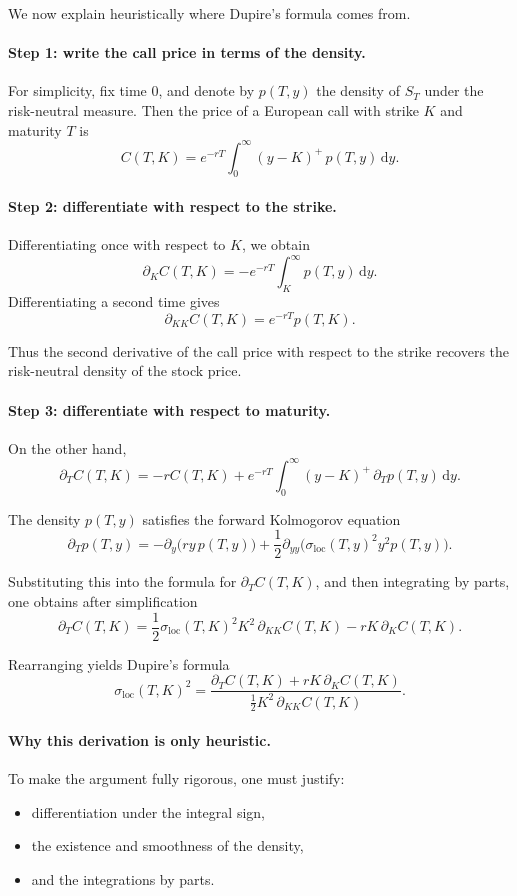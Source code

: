 \documentclass[11pt]{article}
\theoremstyle{plain}
\theoremstyle{definition}
\theoremstyle{remark}
\begin{document}
We now explain heuristically where Dupire's formula comes from.

\paragraph{Step 1: write the call price in terms of the density.}
For simplicity, fix time \(0\), and denote by \(p(T,y)\) the density of
\(S_T\) under the risk-neutral measure.
Then the price of a European call with strike \(K\) and maturity \(T\)
is
\[
C(T,K)
=
e^{-rT}\int_0^\infty (y-K)^+\,p(T,y)\,\mathrm{d}y.
\]

\paragraph{Step 2: differentiate with respect to the strike.}
Differentiating once with respect to \(K\), we obtain
\[
\partial_K C(T,K)
=
-e^{-rT}\int_K^\infty p(T,y)\,\mathrm{d}y.
\]
Differentiating a second time gives
\[
\partial_{KK} C(T,K)
=
e^{-rT}p(T,K).
\]

Thus the second derivative of the call price with respect to the strike
recovers the risk-neutral density of the stock price.

\paragraph{Step 3: differentiate with respect to maturity.}
On the other hand,
\[
\partial_T C(T,K)
=
-rC(T,K)
+
e^{-rT}\int_0^\infty (y-K)^+\,\partial_T p(T,y)\,\mathrm{d}y.
\]

The density \(p(T,y)\) satisfies the forward Kolmogorov equation
\[
\partial_T p(T,y)
=
-\partial_y\big(ry\,p(T,y)\big)
+
\frac12\partial_{yy}\Big(\sigma_{\mathrm{loc}}(T,y)^2y^2p(T,y)\Big).
\]

Substituting this into the formula for \(\partial_T C(T,K)\), and then
integrating by parts, one obtains after simplification
\[
\partial_T C(T,K)
=
\frac12 \sigma_{\mathrm{loc}}(T,K)^2K^2\,\partial_{KK}C(T,K)
-rK\,\partial_K C(T,K).
\]

Rearranging yields Dupire's formula
\[
\sigma_{\mathrm{loc}}(T,K)^2
=
\frac{
\partial_T C(T,K)+rK\,\partial_K C(T,K)
}{
\frac12 K^2\,\partial_{KK}C(T,K)
}.
\]

\paragraph{Why this derivation is only heuristic.}
To make the argument fully rigorous, one must justify:
\begin{itemize}[leftmargin=1.4em]
    \item differentiation under the integral sign,
    \item the existence and smoothness of the density,
    \item and the integrations by parts.
\end{itemize}
\end{document}
